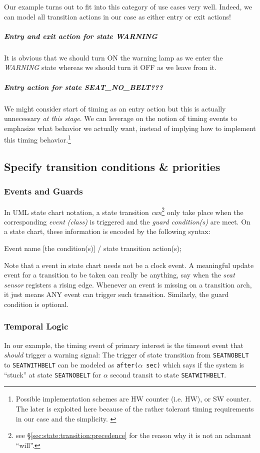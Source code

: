 \documentclass[12pt,a4paper]{scrartcl}
\begin{document}
		Our example turns out to fit into this category of use cases very well. Indeed, we can model all transition actions in our case as either entry or exit actions!
	
		\subparagraph{Entry and exit action for state \textit{WARNING}} It is obvious that we should turn ON the warning lamp as we enter the \textit{WARNING} state
		whereas we should turn it OFF as we leave from it.
		
		\subparagraph{Entry action for state \textit{SEAT\_NO\_BELT}???} We might consider start of timing as an entry action but this is actually unnecessary \textit{at this stage}. We can leverage on the notion of timing events to emphasize what behavior we actually want, instead of implying how to implement this timing behavior.\footnote{Possible implementation schemes are HW counter (i.e. HW), or SW counter. The later is exploited here because of the rather tolerant timing requirements in our case and the simplicity. \label{fn:Implementation:Timer}}
	 
	\subsection{Specify transition conditions \& priorities} \label{sec:UML:transition:spec}
	\subsubsection{Events and Guards}
	In UML state chart notation, a state transition \textit{can}\footnote{see \S \ref{sec:state:transition:precedence} for the reason why it is not an adamant ``will''.} only take place when the corresponding \textit{event (class)} is triggered and the \textit{guard condition(s)} are meet. On a state chart, these information is encoded by the following syntax:
	\begin{center}
		Event name [the condition(s)] / state transition action(s); 
	\end{center}
	Note that a event in state chart needs not be a clock event. 
	A meaningful update event for a transition to be taken can really be anything, say when the \textit{seat sensor} registers a rising edge. 
	Whenever an event is missing on a transition arch, it just means ANY event can trigger such transition.
	Similarly, the guard condition is optional.
	
	
	\subsubsection{Temporal Logic} \label{sec:UML:TemporalLogic}
		In our example, the timing event of primary interest is the timeout event that \textit{should} trigger a warning signal:
		The trigger of state transition from \texttt{SEAT\textunderscore NO\textunderscore BELT}
		to \texttt{SEAT\textunderscore WITH\textunderscore BELT} can be modeled as \texttt{after($\alpha$ sec)}
		which says if the system is ``stuck'' at state \texttt{SEAT\textunderscore NO\textunderscore BELT}
		for $\alpha$ second transit to state \texttt{SEAT\textunderscore WITH\textunderscore BELT}.
		
\end{document}
